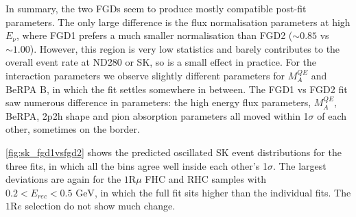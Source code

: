 In summary, the two FGDs seem to produce mostly compatible post-fit parameters. The only large difference is the flux normalisation parameters at high $E_\nu$, where FGD1 prefers a much smaller normalisation than FGD2 ($\sim 0.85$ vs $\sim 1.00$). However, this region is very low statistics and barely contributes to the overall event rate at ND280 or SK, so is a small effect in practice. For the interaction parameters we observe slightly different parameters for $M_A^{QE}$ and BeRPA B, in which the fit settles somewhere in between.
The FGD1 vs FGD2 fit saw numerous difference in parameters: the high energy flux parameters, $M_A^{QE}$, BeRPA, 2p2h shape and pion absorption parameters all moved within 1$\sigma$ of each other, sometimes on the border.

\autoref{fig:sk_fgd1vsfgd2} shows the predicted oscillated SK event distributions for the three fits, in which all the bins agree well inside each other's 1$\sigma$. The largest deviations are again for the $1\text{R}\mu$ FHC and RHC samples with $0.2 < E_{rec}<0.5\text{ GeV}$, in which the full fit sits higher than the individual fits. The $1\text{R}e$ selection do not show much change.
